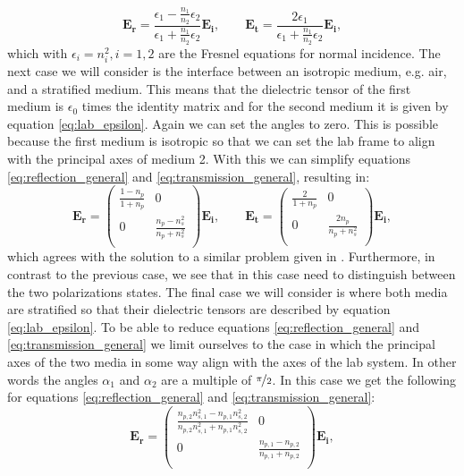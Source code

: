 \begin{equation}
    \bm{E_r} = \frac{\epsilon_1-\frac{n_1}{n_2}\epsilon_2}{\epsilon_1+\frac{n_1}{n_2}\epsilon_2}\bm{E_i}, \qquad \bm{E_t} = \frac{2\epsilon_1}{\epsilon_1+\frac{n_1}{n_2}\epsilon_2}\bm{E_i},
\end{equation}
which with $\epsilon_i=n_i^2, i=1,2$ are the Fresnel equations for normal incidence. The next case we will consider is the interface between an isotropic medium, e.g. air, and a stratified medium. This means that the dielectric tensor of the first medium is $\epsilon_0$ times the identity matrix and for the second medium it is given by equation \ref{eq:lab_epsilon}. Again we can set the angles to zero. This is possible because the first medium is isotropic so that we can set the lab frame to align with the principal axes of medium 2. With this we can simplify equations \ref{eq:reflection_general} and \ref{eq:transmission_general}, resulting in:
\begin{equation}
    \bm{E_r} =
    \begin{pmatrix}
        \frac{1-n_p}{1+n_p} & 0 \\
        0 & \frac{n_p-n_s^2}{n_p+n_s^2} \\
    \end{pmatrix}
    \bm{E_i}, \qquad
    \bm{E_t} =
    \begin{pmatrix}
        \frac{2}{1+n_p} & 0 \\
        0 & \frac{2n_p}{n_p+n_s^2} \\
    \end{pmatrix}
    \bm{E_i},
\end{equation}
which agrees with the solution to a similar problem given in \cite{Lim1993}. Furthermore, in contrast to the previous case, we see that in this case need to distinguish between the two polarizations states. The final case we will consider is where both media are stratified so that their dielectric tensors are described by equation \ref{eq:lab_epsilon}. To be able to reduce equations \ref{eq:reflection_general} and \ref{eq:transmission_general} we limit ourselves to the case in which the principal axes of the two media in some way align with the axes of the lab system. In other words the angles $\alpha_1$ and $\alpha_2$ are a multiple of $\nicefrac{\pi}{2}$. In this case we get the following for equations \ref{eq:reflection_general} and \ref{eq:transmission_general}:
\begin{equation}
    \bm{E_r} =
    \begin{pmatrix}
        \frac{n_{p,2}n_{s,1}^2-n_{p,1}n_{s,2}^2}{n_{p,2}n_{s,1}^2+n_{p,1}n_{s,2}^2} & 0 \\
        0 & \frac{n_{p,1}-n_{p,2}}{n_{p,1}+n_{p,2}} \\
    \end{pmatrix}
    \bm{E_i},
\end{equation}
